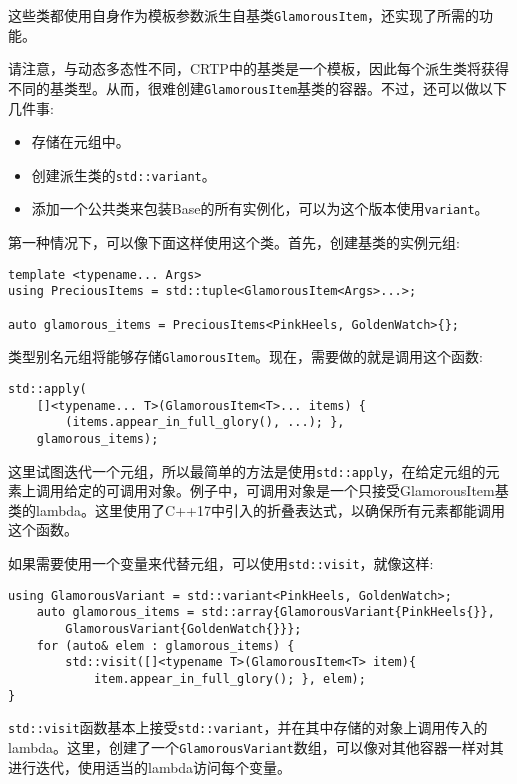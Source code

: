 这些类都使用自身作为模板参数派生自基类\texttt{GlamorousItem}，还实现了所需的功能。

请注意，与动态多态性不同，CRTP中的基类是一个模板，因此每个派生类将获得不同的基类型。从而，很难创建\texttt{GlamorousItem}基类的容器。不过，还可以做以下几件事:

\begin{itemize}
\item 
存储在元组中。

\item 
创建派生类的\texttt{std::variant}。

\item 
添加一个公共类来包装Base的所有实例化，可以为这个版本使用\texttt{variant}。
\end{itemize}

第一种情况下，可以像下面这样使用这个类。首先，创建基类的实例元组:

\begin{lstlisting}[style=styleCXX]
template <typename... Args>
using PreciousItems = std::tuple<GlamorousItem<Args>...>;

auto glamorous_items = PreciousItems<PinkHeels, GoldenWatch>{};
\end{lstlisting}

类型别名元组将能够存储\texttt{GlamorousItem}。现在，需要做的就是调用这个函数:

\begin{lstlisting}[style=styleCXX]
std::apply(
	[]<typename... T>(GlamorousItem<T>... items) {
		(items.appear_in_full_glory(), ...); },
	glamorous_items);
\end{lstlisting}

这里试图迭代一个元组，所以最简单的方法是使用\texttt{std::apply}，在给定元组的元素上调用给定的可调用对象。例子中，可调用对象是一个只接受GlamorousItem基类的lambda。这里使用了C++17中引入的折叠表达式，以确保所有元素都能调用这个函数。

如果需要使用一个变量来代替元组，可以使用\texttt{std::visit}，就像这样:

\begin{lstlisting}[style=styleCXX]
	using GlamorousVariant = std::variant<PinkHeels, GoldenWatch>;
	auto glamorous_items = std::array{GlamorousVariant{PinkHeels{}},
		GlamorousVariant{GoldenWatch{}}};
	for (auto& elem : glamorous_items) {
		std::visit([]<typename T>(GlamorousItem<T> item){
			item.appear_in_full_glory(); }, elem);
}
\end{lstlisting}

\texttt{std::visit}函数基本上接受\texttt{std::variant}，并在其中存储的对象上调用传入的lambda。这里，创建了一个\texttt{GlamorousVariant}数组，可以像对其他容器一样对其进行迭代，使用适当的lambda访问每个变量。

